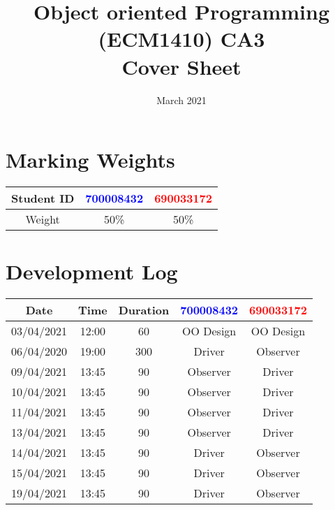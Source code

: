 \documentclass{article}
\title{%
  Object oriented Programming (ECM1410) CA3 \\
  \large Cover Sheet}
\date{March 2021}
\begin{document}
\maketitle

\section{Marking Weights}
\begin{center}
\begin{tabular}{ |c|c|c| } 
 \hline
 Student ID & \textcolor{blue}{700008432} & \textcolor{red}{690033172} \\
 \hline
 Weight & 50\% & 50\% \\
 \hline
\end{tabular}
\end{center}

\section{Development Log}
\begin{tabular}{ |c|c|c|c|c| } 
 \hline
 Date & Time & Duration & \textcolor{blue}{700008432} & \textcolor{red}{690033172} \\
 \hline
 03/04/2021&12:00&60&OO Design&OO Design \\
 \hline
 06/04/2020&19:00&300&Driver&Observer \\
 \hline
 09/04/2021&13:45&90&Observer&Driver \\
 \hline
 10/04/2021&13:45&90&Observer&Driver \\
 \hline
 11/04/2021&13:45&90&Observer&Driver \\
 \hline
 13/04/2021&13:45&90&Observer&Driver \\
 \hline
 14/04/2021&13:45&90&Driver&Observer \\
 \hline
 15/04/2021&13:45&90&Driver&Observer\\
 \hline
 19/04/2021&13:45&90&Driver&Observer \\
 \hline
\end{tabular}
\end{document}
